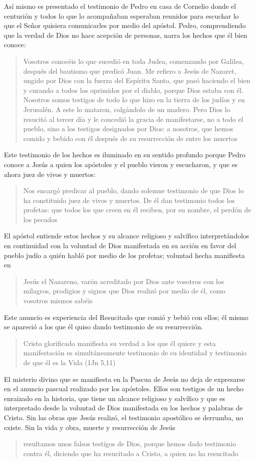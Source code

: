 Así mismo es presentado el testimonio de Pedro en casa de Cornelio donde el centurión y todos lo que lo acompañaban esperaban reunidos para escuchar lo que el Señor quisiera comunicarles por medio del apóstol. Pedro, comprendiendo que la verdad de Dios no hace acepción de personas, narra los hechos que él bien conoce: \blockquote[][\,(Hch 10,37-41)]{Vosotros conocéis lo que sucedió en toda Judea, comenzando por Galilea, después del bautismo que predicó Juan. Me refiero a Jesús de Nazaret, ungido por Dios con la fuerza del Espíritu Santo, que pasó haciendo el bien y curando a todos los oprimidos por el diablo, porque Dios estaba con él. Nosotros somos testigos de todo lo que hizo en la tierra de los judíos y en Jerusalén. A este lo mataron, colgándolo de un madero. Pero Dios lo resucitó al tercer día y le concedió la gracia de manifestarse, no a todo el pueblo, sino a los testigos designados por Dios: a nosotros, que hemos comido y bebido con él después de su resurrección de entre los muertos}. Este testimonio de los hechos es iluminado en su sentido profundo porque Pedro conoce a Jesús a quien los apóstoles y el pueblo vieron y escucharon, y que es ahora juez de vivos y muertos: \blockquote[][\,(Hch 10,42-43)]{Nos encargó predicar al pueblo, dando solemne testimonio de que Dios lo ha constituido juez de vivos y muertos. De él dan testimonio todos los profetas: que todos los que creen en él reciben, por su nombre, el perdón de los pecados}.

El apóstol entiende estos hechos y su alcance religioso y salvífico interpretándolos en continuidad con la voluntad de Dios manifestada en su acción en favor del pueblo judío a quién habló por medio de los profetas; voluntad hecha manifiesta en \blockquote[][\,(Hch 2,22)]{Jesús el Nazareno, varón acreditado por Dios ante vosotros con los milagros, prodigios y signos que Dios realizó por medio de él, como vosotros mismos sabéis}.

Este anuncio es experiencia del Resucitado que comió y bebió con ellos; él mismo se apareció a los que él quiso dando testimonio de su resurrección. \blockquote[{\cite[129]{prades2015testimonio}}]{Cristo glorificado manifiesta su verdad a los que él quiere y esta manifestación es simultáneamente testimonio de su identidad y testimonio de que él es la Vida (1Jn 5,11)}.

El misterio divino que se manifiesta en la Pascua de Jesús no deja de expresarse en el anuncio pascual realizado por los apóstoles. Ellos son testigos de un hecho enraizado en la historia, que tiene un alcance religioso y salvífico y que es interpretado desde la voluntad de Dios manifestada en los hechos y palabras de Cristo. Sin las obras que Jesús realizó, el testimonio apostólico se derrumba, no existe\autocite[Cf.][1529]{latourelle2000testimonio}. Sin la vida y obra, muerte y resurrección de Jesús \blockquote[][\,(1Cor 15,15)]{resultamos unos falsos testigos de Dios, porque hemos dado testimonio contra él, diciendo que ha resucitado a Cristo, a quien no ha resucitado}.

